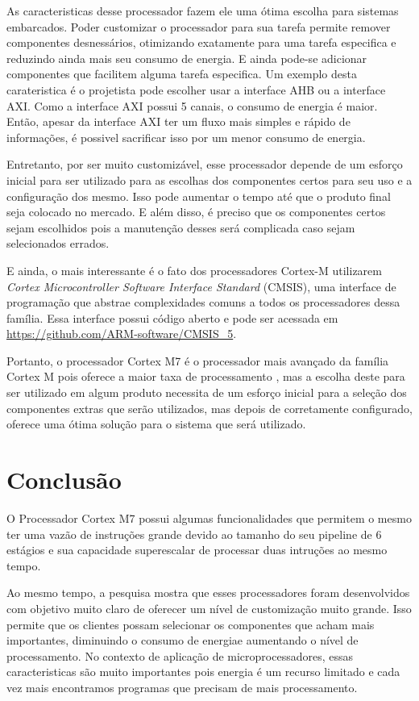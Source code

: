 \documentclass[10pt, a4paper]{article}
\begin{document}
As caracteristicas desse processador fazem ele uma ótima escolha para sistemas embarcados. Poder customizar o processador para sua tarefa permite remover componentes desnessários, otimizando exatamente para uma tarefa especifica e reduzindo ainda mais seu consumo de energia. E ainda pode-se adicionar componentes que facilitem alguma tarefa especifica. Um exemplo desta carateristica é o projetista pode escolher usar a interface AHB ou a interface AXI\autocite{axi-experiment}. Como a interface AXI possui 5 canais, o consumo de energia é maior. Então, apesar da interface AXI ter um fluxo mais simples e rápido de informações, é possivel sacrificar isso por um menor consumo de energia.

Entretanto, por ser muito customizável, esse processador depende de um esforço inicial para ser utilizado para as escolhas dos componentes certos para seu uso e a configuração dos mesmo. Isso pode aumentar o tempo até que o produto final seja colocado no mercado. E além disso, é preciso que os componentes certos sejam escolhidos pois a manutenção desses será complicada caso sejam selecionados errados.

E ainda, o mais interessante é o fato dos processadores Cortex-M utilizarem \textit{Cortex Microcontroller Software Interface Standard} (CMSIS), uma interface de programação que abstrae complexidades comuns a todos os processadores dessa família. Essa interface possui código aberto e pode ser acessada em \url{https://github.com/ARM-software/CMSIS_5}.

Portanto, o processador Cortex M7 é o processador mais avançado da família Cortex M pois oferece a maior taxa de processamento \autocite{arm-white-paper}, mas a escolha deste para ser utilizado em algum produto necessita de um esforço inicial para a seleção dos componentes extras que serão utilizados, mas depois de corretamente configurado, oferece uma ótima solução para o sistema que será utilizado.


\section{Conclusão}

O Processador Cortex M7 possui algumas funcionalidades que permitem o mesmo ter uma vazão de instruções grande devido ao tamanho do seu pipeline de 6 estágios e sua capacidade superescalar de processar duas intruções ao mesmo tempo.

Ao mesmo tempo, a pesquisa mostra que esses processadores foram desenvolvidos com objetivo muito claro de oferecer um nível de customização muito grande. Isso permite que os clientes possam selecionar os componentes que acham mais importantes, diminuindo o consumo de energiae aumentando o nível de processamento. No contexto de aplicação de microprocessadores, essas caracteristicas são muito importantes pois energia é um recurso limitado e cada vez mais encontramos programas que precisam de mais processamento.
 

\printbibliography[title={Referências}]
\end{document}
